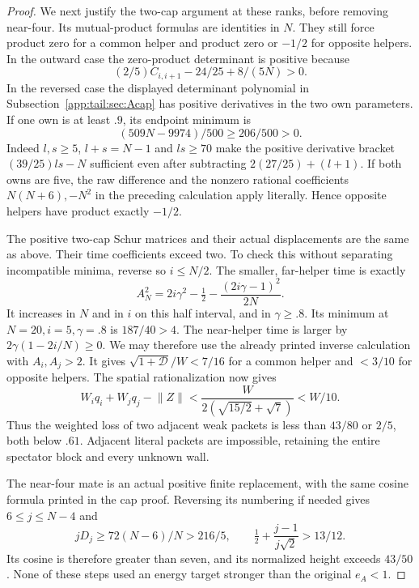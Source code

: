 \documentclass[11pt]{article}
\theoremstyle{definition}
\theoremstyle{remark}
\newcommand{\norm}[1]{\lVert #1\rVert}
\begin{document}
\begin{proof}
We next justify the two-cap argument at these ranks, before removing
near-four. Its mutual-product formulas are identities in $N$.
They still force product zero for a common helper and product zero
or $-1/2$ for opposite helpers. In the outward case the zero-product
determinant is positive because
\[
 (2/5)C_{i,i+1}-24/25+8/(5N)>0.
\]
In the reversed case the displayed determinant polynomial in
Subsection~\ref{app:tail:sec:Acap} has positive derivatives in the
two own parameters. If one own is at least $.9$, its endpoint
minimum is
\[
 (509N-9974)/500\ge206/500>0.
\]
Indeed $l,s\ge5$, $l+s=N-1$ and $ls\ge70$ make the positive
derivative bracket $(39/25)ls-N$ sufficient even after subtracting
$2(27/25)+(l+1)$. If both owns are five, the raw difference
and the nonzero rational coefficients $N(N+6),-N^2$ in the
preceding calculation apply literally. Hence opposite helpers have
product exactly $-1/2$.

The positive two-cap Schur matrices and their actual displacements
are the same as above. Their time coefficients exceed two. To check
this without separating incompatible minima, reverse so $i\le N/2$.
The smaller, far-helper time is exactly
\[
 A_N^2=2i\gamma^2-\tfrac12-
                     {\frac{(2i\gamma-1)^2}{2N}}.
\]
It increases in $N$ and in $i$ on this half interval, and in
$\gamma\ge.8$. Its minimum at $N=20,i=5,\gamma=.8$ is
$187/40>4$. The near-helper time is larger by
$2\gamma(1-2i/N)\ge0$. We may therefore use the already
printed inverse calculation with $A_i,A_j>2$.
It gives $\sqrt{1+\mathcal D}/W<7/16$ for a common helper
and $<3/10$ for opposite helpers. The spatial rationalization
now gives
\[
 W_iq_i+W_jq_j-\norm Z
 <{\frac{W}{2(\sqrt{15/2}+\sqrt7)}}<W/10.
\]
Thus the weighted loss of two adjacent weak packets is less than
$43/80$ or $2/5$, both below $.61$. Adjacent literal packets
are impossible, retaining the entire spectator block and every
unknown wall.

The near-four mate is an actual positive finite replacement, with
the same cosine formula printed in the cap proof. Reversing its
numbering if needed gives $6\le j\le N-4$ and
\[
 jD_j\ge72(N-6)/N>216/5,\qquad
 \tfrac12+{\frac{j-1}{ j\sqrt2}}>13/12.
\]
Its cosine is therefore greater than seven, and its normalized
height exceeds $43/50$. None of these steps used an energy target
stronger than the original $e_A<1$.
\end{proof}
\end{document}
